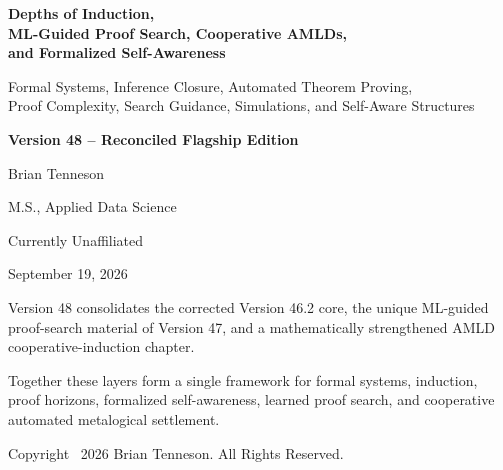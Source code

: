 \documentclass[11pt]{article}
\theoremstyle{remark}
\begin{document}
\begin{titlepage}
\thispagestyle{empty}
\centering
\vspace*{0.55in}
{\Huge\bfseries Depths of Induction,\\[0.10in]
ML-Guided Proof Search, Cooperative AMLDs,\\[0.10in]
and Formalized Self-Awareness\par}
\vspace{0.34in}
{\Large Formal Systems, Inference Closure, Automated Theorem Proving,\\
Proof Complexity, Search Guidance, Simulations, and Self-Aware Structures\par}
\vspace{0.50in}
{\LARGE\bfseries Version 48 -- Reconciled Flagship Edition\par}
\vspace{0.62in}
{\Large Brian Tenneson\par}
\vspace{0.08in}
{\large M.S., Applied Data Science\par}
{\large Currently Unaffiliated\par}
\vfill
{\large September 19, 2026\par}
\vspace{0.26in}
{\small Version 48 consolidates the corrected Version 46.2 core, the unique ML-guided proof-search material of Version 47, and a mathematically strengthened AMLD cooperative-induction chapter.\par}
\vspace{0.18in}
{\small Together these layers form a single framework for formal systems, induction, proof horizons, formalized self-awareness, learned proof search, and cooperative automated metalogical settlement.\par}
\vspace{0.30in}
{\small Copyright \textcopyright\ 2026 Brian Tenneson. All Rights Reserved.\par}
\end{titlepage}
\end{document}
